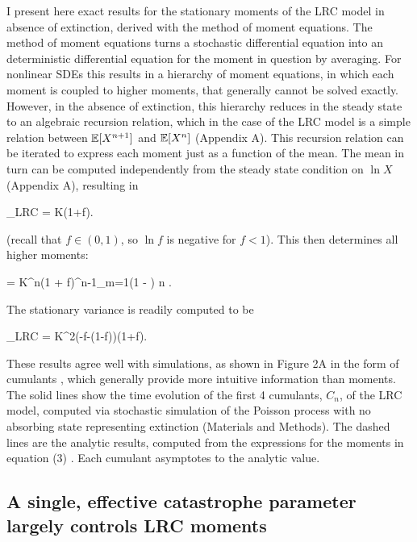 I present here exact results for the stationary moments of the LRC model in absence of extinction, derived with the method of moment equations.  The method of moment equations turns a stochastic differential equation into an deterministic differential equation for the moment in question by averaging.  For nonlinear SDEs this results in a hierarchy of moment equations, in which each moment is coupled to higher moments, that generally cannot be solved exactly.  However, in the absence of extinction, this hierarchy reduces in the steady state to an algebraic recursion relation, which in the case of the LRC model is a simple relation between $\mathbb{E}[X^{n+1}]$ and $\mathbb{E}[X^{n}]$ (Appendix A).  This recursion relation can be iterated to express each moment just as a function of the mean.  The mean in turn can be computed independently from the steady state condition on $\ln X$ (Appendix A), resulting in  

\be
\expec[ X]_{LRC} = K\left(1+\ln f\right).
\ee

\noindent (recall that $f \in (0,1)$, so $\ln f$ is negative for $ f < 1$).  This then determines all higher moments:

\be
\expec[X^n] = K^{n}\left(1 + \ln f\right)\prod^{n-1}_{m=1}\left(1 - \right) \text{,\hspace{1cm}} n .
\ee

\noindent The stationary variance is readily computed to be

\be
 \Var[X]_{LRC} = K^2\left(-\ln f-(1-f)\right)\left(1+\ln f\right).
\ee
  
These results agree well with simulations, as shown in Figure 2A in the form of cumulants \cite{broca2004cumulant}, which generally provide more intuitive information than moments.  The solid lines show the time evolution of the first 4 cumulants, $C_n$, of the LRC model, computed via stochastic simulation of the Poisson process with no absorbing state representing extinction (Materials and Methods).  The dashed lines are the analytic results, computed from the expressions for the moments in equation (3)  \cite{broca2004cumulant}.  Each cumulant asymptotes to the analytic value.


\subsection{A single, effective catastrophe parameter largely controls LRC moments}

